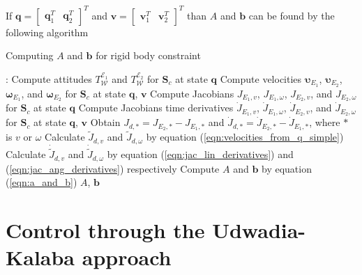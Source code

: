 If $\mathbf{q} = \begin{bmatrix} \mathbf{q}_1^T & \mathbf{q}_2^T \end{bmatrix}^T$ 
and $\mathbf{v} = \begin{bmatrix} \mathbf{v}_1^T & \mathbf{v}_2^T \end{bmatrix}^T$ 
than $A$ and $\mathbf{b}$ can be found by the following algorithm

\begin{algorithm}[H]
    \caption{Computing $A$ and $\mathbf{b}$ for rigid body constraint}

    \begin{algorithmic}[1]
         : 
        \State Compute attitudes $T_{\mathcal{W}}^{\mathcal{E}_1}$ and 
        $T_{\mathcal{W}}^{\mathcal{E}_2}$ for $\mathbf{S}_c$ at state $\mathbf{q}$
        \State Compute velocities $\boldsymbol{\upsilon}_{E_1}$, 
        $\boldsymbol{\upsilon}_{E_2}$, $\boldsymbol{\omega}_{E_1}$, and 
        $\boldsymbol{\omega}_{E_2}$ for $\mathbf{S}_c$ at state $\mathbf{q}$, 
        $\mathbf{v}$
        \State Compute Jacobians $J_{E_1, v}$, $J_{E_1, \omega}$, $J_{E_2, v}$, and 
        $J_{E_2, \omega}$ for $\mathbf{S}_c$ at state $\mathbf{q}$
        \State Compute Jacobians time derivatives $\dot{J}_{E_1, v}$, 
        $\dot{J}_{E_1, \omega}$, $\dot{J}_{E_2, v}$, and $\dot{J}_{E_2, \omega}$ 
        for $\mathbf{S}_c$ at state $\mathbf{q}$, $\mathbf{v}$
        \State Obtain $J_{d, *} = J_{E_2, *} - J_{E_1, *}$ and 
        $\dot{J}_{d, *} = \dot{J}_{E_2, *} - \dot{J}_{E_1, *}$, where $*$ is 
        $v$ or $\omega$
        \State Calculate $\tilde{J}_{d,v}$ and $\tilde{J}_{d, \omega}$ by equation 
        (\ref{eqn:velocities_from_q_simple})
        \State Calculate $\dot{\tilde{J}}_{d,v}$ and $\dot{\tilde{J}}_{d, \omega}$ by 
        equation (\ref{eqn:jac_lin_derivatives}) and (\ref{eqn:jac_ang_derivatives}) 
        respectively
        \State Compute $A$ and $\mathbf{b}$ by equation (\ref{eqn:a_and_b})
        \State \Return $A$, $\mathbf{b}$
        \EndFunction
    \end{algorithmic}

    \label{alg:get_a_and_b}
\end{algorithm}

\section{Control through the Udwadia-Kalaba approach} 
\label{sec:control_through_udwadia}

